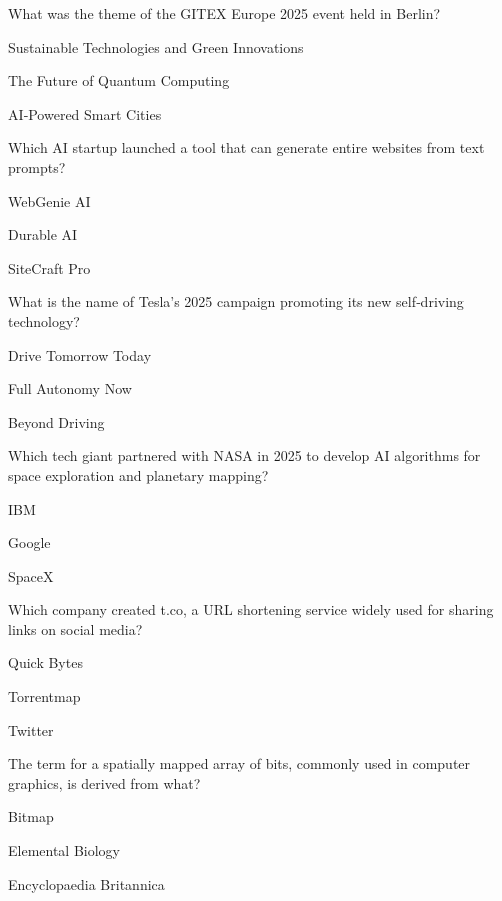 \begin{enhancedmcq}{What was the theme of the GITEX Europe 2025 event held in Berlin?}
\item Sustainable Technologies and Green Innovations
\item The Future of Quantum Computing
\item AI‑Powered Smart Cities

\end{enhancedmcq}
\begin{enhancedmcq}{Which AI startup launched a tool that can generate entire websites from text prompts?}
\item WebGenie AI
\item Durable AI
\item SiteCraft Pro

\end{enhancedmcq}
\begin{enhancedmcq}{What is the name of Tesla's 2025 campaign promoting its new self‑driving technology?}
\item Drive Tomorrow Today
\item Full Autonomy Now
\item Beyond Driving

\end{enhancedmcq}
\begin{enhancedmcq}{Which tech giant partnered with NASA in 2025 to develop AI algorithms for space exploration and planetary mapping?}
\item IBM
\item Google
\item SpaceX

\end{enhancedmcq}
\begin{enhancedmcq}{Which company created t.co, a URL shortening service widely used for sharing links on social media?}
\item Quick Bytes
\item Torrentmap
\item Twitter

\end{enhancedmcq}
\begin{enhancedmcq}{The term for a spatially mapped array of bits, commonly used in computer graphics, is derived from what?}
\item Bitmap
\item Elemental Biology
\item Encyclopaedia Britannica

\end{enhancedmcq}
